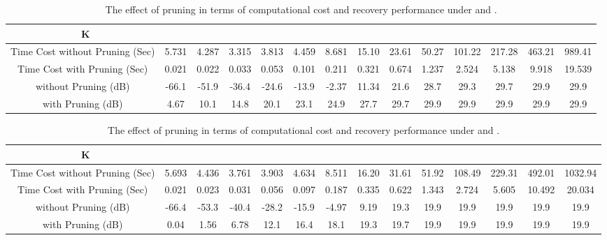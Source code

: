 \documentclass[journal,onecolumn,11pt]{IEEEtran}
\begin{document}
\begin{table}[t]
\fontsize{7.5pt}{1em}\selectfont
\centering
\setlength{\abovecaptionskip}{0pt}
\setlength{\belowcaptionskip}{4pt}
\caption{The effect of pruning in terms of computational cost and recovery performance under  and  .}
\label{Table: pruning comparision}
\doublerulesep=2pt
\begin{tabular}[tc]{|c|c|c|c|c|c|c|c|c|c|c|c|c|c|}
\hline
{\LARGE \textcolor{white}{o}}K& & &  & &  &  &  &  &  &  &  &  &  \\ \hline
Time Cost without Pruning (Sec)& 5.731& 4.287& 3.315 & 3.813 & 4.459 & 8.681 & 15.10 & 23.61 & 50.27 & 101.22 & 217.28 & 463.21 & 989.41  \\ \hline
Time Cost with Pruning (Sec)& 0.021&  0.022 & 0.033 & 0.053 & 0.101 & 0.211 & 0.321 & 0.674 & 1.237 & 2.524 & 5.138 & 9.918 &19.539 \\ \hline
 without Pruning (dB)& -66.1& -51.9& -36.4 & -24.6 & -13.9 & -2.37 & 11.34 & 21.6 & 28.7 & 29.3 & 29.7 & 29.9 & 29.9 \\ \hline
  with Pruning (dB)& 4.67& 10.1& 14.8 & 20.1 & 23.1 & 24.9 & 27.7 & 29.7 & 29.9 & 29.9 & 29.9 & 29.9 & 29.9 \\ \hline
\end{tabular}
\end{table}

\begin{table}[t]
\fontsize{7.5pt}{1em}\selectfont
\centering
\setlength{\abovecaptionskip}{0pt}
\setlength{\belowcaptionskip}{4pt}
\caption{The effect of pruning in terms of computational cost and recovery performance under  and  .}
\label{Table: pruning comparision 2}
\doublerulesep=2pt
\begin{tabular}[tc]{|c|c|c|c|c|c|c|c|c|c|c|c|c|c|}
\hline
{\LARGE \textcolor{white}{o}}K& & &  & &  &  &  &  &  &  &  &  & \\ \hline
Time Cost without Pruning (Sec)& 5.693& 4.436& 3.761 & 3.903 & 4.634 & 8.511 & 16.20 & 31.61 & 51.92 & 108.49 & 229.31 & 492.01 &1032.94 \\ \hline
Time Cost with Pruning (Sec)& 0.021&  0.023 & 0.031 & 0.056 & 0.097 & 0.187 & 0.335 & 0.622 & 1.343 & 2.724 & 5.605 & 10.492 &20.034 \\ \hline
 without Pruning (dB)& -66.4& -53.3& -40.4 & -28.2 & -15.9 & -4.97 & 9.19 & 19.3 & 19.9& 19.9& 19.9& 19.9& 19.9 \\ \hline
  with Pruning (dB)& 0.04& 1.56 & 6.78 & 12.1 & 16.4 & 18.1 & 19.3 & 19.7 & 19.9& 19.9& 19.9& 19.9& 19.9 \\ \hline
\end{tabular}
\end{table}
\end{document}
